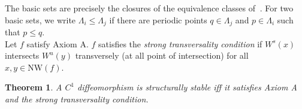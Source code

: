 \documentclass{article}
\newtheorem{thm}{Theorem}
\begin{document}
The basic sets are precisely the closures of the equivalence classes of $~$. For two basic sets, we write $\Lambda_i \leq \Lambda_j$ if there are periodic points $q \in \Lambda_j$ and $p \in \Lambda_i$ such that $p \leq q$. \\
\indent Let $f$ satisfy Axiom A. $f$ satisfies the \textit{strong transversality condition} if $W^s(x)$ intersects $W^u(y)$ transversely (at all point of intersection) for all $x,y \in \mathrm{NW}(f)$. \\

\begin{thm}

A $C^1$ diffeomorphism is structurally stable iff it satisfies Axiom A and the strong transversality condition. 

\end{thm}
\end{document}
